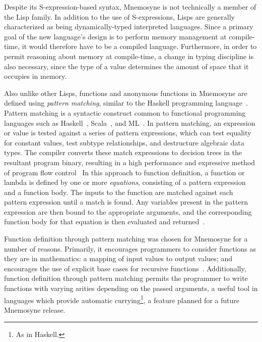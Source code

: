 Despite its S-expression-based syntax, Mnemosyne is not technically a member of the Lisp family. In addition to the use of S-expressions, Lisps are generally characterized as being dynamically-typed interpreted languages. Since a primary goal of the new language's design is to perform memory management at compile-time, it would therefore have to be a compiled language. Furthermore, in order to permit reasoning about memory at compile-time, a change in typing discipline is also necessary, since the type of a value determines the amount of space that it occupies in memory.

Also unlike other Lisps, functions and anonymous functions in Mnemosyne are defined using \textit{pattern matching}, similar to the Haskell programming language~\cite{jones2003haskell,hudak1992gentle,hudak1992report}. Pattern matching is a syntactic construct common to functional programming languages such as Haskell~\cite{jones2003haskell,hudak1992report,hudak1992gentle}, Scala~\cite{odersky2004scala,odersky2004overview}, and ML~\cite{maranget2008compiling,Krishnaswami:2009:FPM:1594834.1480927}. In pattern matching, an expression or value is tested against a series of pattern expressions, which can test equality for constant values, test subtype relationships, and destructure algebraic data types. The compiler converts these match expressions to decision trees in the resultant program binary, resulting in a high performance and expressive method of program flow control~\cite{maranget2007warnings,Krishnaswami:2009:FPM:1594834.1480927,syme2007extensible,maranget2008compiling} In this approach to function definition, a function or lambda is defined by one or more \textit{equations}, consisting of a pattern expression and a function body. The inputs to the function are matched against each pattern expression until a match is found. Any variables present in the pattern expression are then bound to the appropriate arguments, and the corresponding function body for that equation is then evaluated and returned~\cite{jones2003haskell,hudak1992report}.

Function definition through pattern matching was chosen for Mnemosyne for a number of reasons. Primarily, it encourages programmers to consider functions as they are in mathematics: a mapping of input values to output values; and encourages the use of explicit base cases for recursive functions~\cite{hudak1992gentle}. Additionally, function definition through pattern matching permits the programmer to write functions with varying arities depending on the passed arguments, a useful tool in languages which provide automatic currying\footnote{As in Haskell.}, a feature planned for a future Mnemosyne release.

